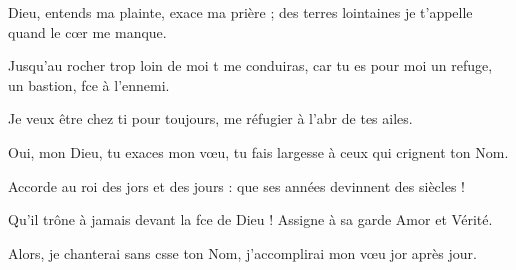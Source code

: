 \item Dieu, entends ma plainte, exace ma prière ;\psstar{} des terres lointaines je t’appelle quand le cœr me manque. 
\item Jusqu’au rocher trop loin de moi t me conduiras,\psstar{} car tu es pour moi un refuge, un bastion, fce à l’ennemi.
\item Je veux être chez ti pour toujours,\psstar{} me réfugier à l’abr de tes ailes.
\item Oui, mon Dieu, tu exaces mon vœu,\psstar{} tu fais largesse à ceux qui crignent ton Nom.
\item Accorde au roi des jors et des jours :\psstar{} que ses années devinnent des siècles !
\item Qu’il trône à jamais devant la fce de Dieu !\psstar{} Assigne à sa garde Amor et Vérité.
\item Alors, je chanterai sans csse ton Nom,\psstar{} j’accomplirai mon vœu jor après jour.